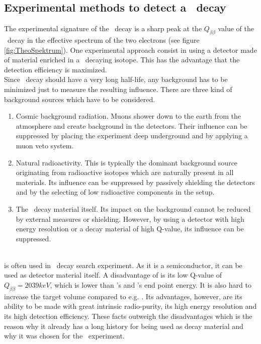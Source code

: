 \documentclass[encoding=utf8,british]{tumphthesis}
\begin{document}
\subsection{Experimental methods to detect a \onbb\ decay}

The experimental signature of the \onbb\ decay is a sharp peak at the $Q_{\beta\beta}$ value of the \twonu\ decay in the effective spectrum of the two electrons (see figure \ref{fig:TheoSpektrum}).
One experimental approach consist in using a detector made of material enriched in a \onbb\ decaying isotope.
This has the advantage that the detection efficiency is maximized.
\\

Since \onbb\ decay should have a very long half-life, any background has to be minimized just to measure the resulting influence.
There are three kind of background sources which have to be considered.
\begin{enumerate}
    \item Cosmic background radiation.
Muons shower down to the earth from the atmosphere and create background in the detectors.
Their influence can be suppressed by placing the experiment deep underground and by applying a muon veto system.
\item Natural radioactivity.
This is typically the dominant background source originating from radioactive isotopes which are naturally present in all materials.
Its influence can be suppressed by passively shielding the detectors and by the selecting of low radioactive components in the setup. 
\item The \twonu\ decay material itself.
Its impact on the background cannot be reduced by external measures or shielding.
However, by using a detector with high energy resolution or a decay material of high Q-value, its influence can be suppressed.
\end{enumerate}
\\

 is often used in \onbb\ decay search experiment. 
As it is a semiconductor, it can be used as detector material itself.
A disadvantage of  is its low Q-value of $Q_{\beta\beta} = 2039\unit{keV}$, which is lower than 's and 's end point energy.
It is also hard to increase the target volume compared to e.g. .
Its advantages, however, are its ability to be made with great intrinsic radio-purity, its high energy resolution and its high detection efficiency.
These facts outweigh the disadvantages which is the reason why it already has a long history for being used as decay material and why it was chosen for the \gerda\ experiment.
\\
\end{document}
